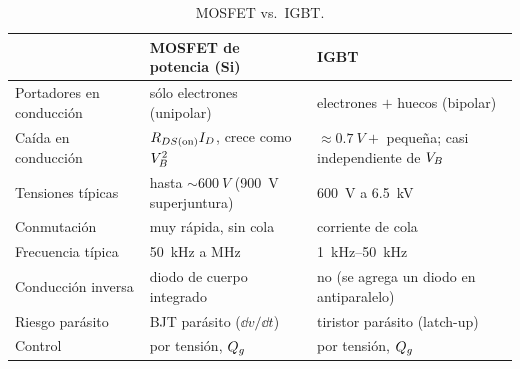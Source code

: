 \begin{table}[H]
\centering\small
\begin{tabularx}{\textwidth}{>{\raggedright\arraybackslash}p{3.3cm}>{\raggedright\arraybackslash}X>{\raggedright\arraybackslash}X}
\toprule
 & MOSFET de potencia (Si) & IGBT \\
\midrule
Portadores en conducción & sólo electrones (unipolar) & electrones $+$ huecos (bipolar) \\
Caída en conducción & $R_{DS(\mathrm{on})} I_D$, crece como $V_{B}^2$ & $\approx\SI{0.7}{V}+$ pequeña; casi independiente de $V_{B}$ \\
Tensiones típicas & hasta $\sim\SI{600}{V}$ (\SI{900}{V} superjuntura) & \SI{600}{V} a \SI{6.5}{kV} \\
Conmutación & muy rápida, sin cola & corriente de cola \\
Frecuencia típica & \SI{50}{kHz} a \si{MHz} & \SIrange{1}{50}{kHz} \\
Conducción inversa & diodo de cuerpo integrado & no (se agrega un diodo en antiparalelo) \\
Riesgo parásito & BJT parásito ($\dd v/\dd t$) & tiristor parásito (latch-up) \\
Control & por tensión, $Q_{g}$ & por tensión, $Q_{g}$ \\
\bottomrule
\end{tabularx}
\caption{MOSFET vs.\ IGBT.}
\label{tab:mosfet-igbt}
\end{table}
